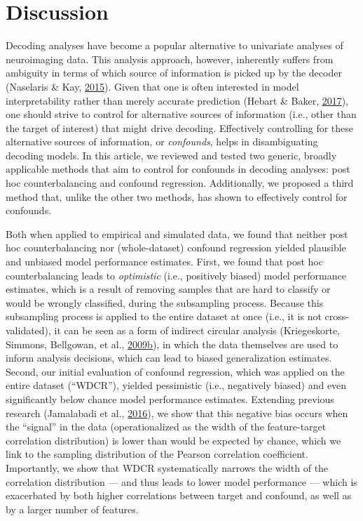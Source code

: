 \documentclass[11pt,american,a4paper,oneside,]{memoir} %
\begin{document}
\hypertarget{confounds-decoding-discussion}{%
\section{Discussion}\label{confounds-decoding-discussion}}

Decoding analyses have become a popular alternative to univariate analyses of neuroimaging data. This analysis approach, however, inherently suffers from ambiguity in terms of which source of information is picked up by the decoder (Naselaris \& Kay, \protect\hyperlink{ref-Naselaris2015-jn}{2015}). Given that one is often interested in model interpretability rather than merely accurate prediction (Hebart \& Baker, \protect\hyperlink{ref-Hebart2017-jn}{2017}), one should strive to control for alternative sources of information (i.e., other than the target of interest) that might drive decoding. Effectively controlling for these alternative sources of information, or \emph{confounds}, helps in disambiguating decoding models. In this article, we reviewed and tested two generic, broadly applicable methods that aim to control for confounds in decoding analyses: post hoc counterbalancing and confound regression. Additionally, we proposed a third method that, unlike the other two methods, has shown to effectively control for confounds.

Both when applied to empirical and simulated data, we found that neither post hoc counterbalancing nor (whole-dataset) confound regression yielded plausible and unbiased model performance estimates. First, we found that post hoc counterbalancing leads to \emph{optimistic} (i.e., positively biased) model performance estimates, which is a result of removing samples that are hard to classify or would be wrongly classified, during the subsampling process. Because this subsampling process is applied to the entire dataset at once (i.e., it is not cross-validated), it can be seen as a form of indirect circular analysis (Kriegeskorte, Simmons, Bellgowan, et al., \protect\hyperlink{ref-Kriegeskorte2009-yz}{2009}\protect\hyperlink{ref-Kriegeskorte2009-yz}{b}), in which the data themselves are used to inform analysis decisions, which can lead to biased generalization estimates. Second, our initial evaluation of confound regression, which was applied on the entire dataset (``WDCR''), yielded pessimistic (i.e., negatively biased) and even significantly below chance model performance estimates. Extending previous research (Jamalabadi et al., \protect\hyperlink{ref-jamalabadi2016classification}{2016}), we show that this negative bias occurs when the ``signal'' in the data (operationalized as the width of the feature-target correlation distribution) is lower than would be expected by chance, which we link to the sampling distribution of the Pearson correlation coefficient. Importantly, we show that WDCR systematically narrows the width of the correlation distribution --- and thus leads to lower model performance --- which is exacerbated by both higher correlations between target and confound, as well as by a larger number of features.
\end{document}
